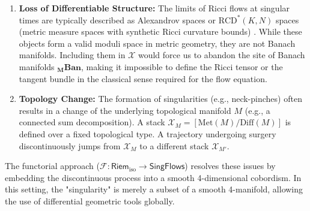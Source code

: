 \documentclass[11pt]{article}
\newcommand{\RiemIso}{\mathsf{Riem}_{\mathrm{iso}}}
\newcommand{\SingFlows}{\mathsf{SingFlows}}
\newcommand{\Met}{\mathrm{Met}}
\newcommand{\Diff}{\mathrm{Diff}}
\begin{document}
\begin{enumerate}
    \item \textbf{Loss of Differentiable Structure:} The limits of Ricci flows at singular times are typically described as Alexandrov spaces or $\mathrm{RCD}^*(K,N)$ spaces (metric measure spaces with synthetic Ricci curvature bounds) \cite{Bam20}. While these objects form a valid moduli space in metric geometry, they are not Banach manifolds. Including them in $\mathcal{X}$ would force us to abandon the site of Banach manifolds $\mathbf{_M Ban}$, making it impossible to define the Ricci tensor or the tangent bundle in the classical sense required for the flow equation.
    
    \item \textbf{Topology Change:} The formation of singularities (e.g., neck-pinches) often results in a change of the underlying topological manifold $M$ (e.g., a connected sum decomposition). A stack $\mathcal{X}_M = [\Met(M)/\Diff(M)]$ is defined over a fixed topological type. A trajectory undergoing surgery discontinuously jumps from $\mathcal{X}_M$ to a different stack $\mathcal{X}_{M'}$. 
\end{enumerate}

The functorial approach ($\mathcal{F}: \RiemIso \to \SingFlows$) resolves these issues by embedding the discontinuous process into a smooth 4-dimensional cobordism. In this setting, the "singularity" is merely a subset of a smooth 4-manifold, allowing the use of differential geometric tools globally.
\end{document}

